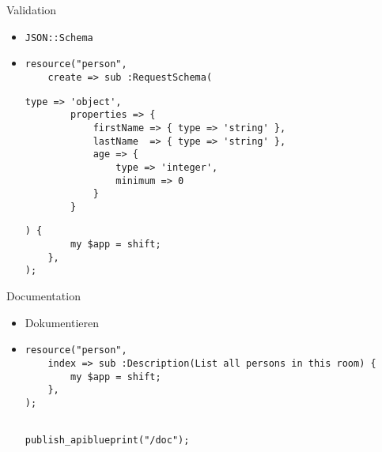 \documentclass[aspectratio=1610]{beamer}
\begin{document}
\begin{frame}[fragile]{Validation}

\begin{itemize}
\item \texttt{JSON::Schema}
\pause
\item[]
\begin{lstlisting}
resource("person",
    create => sub :RequestSchema(
\end{lstlisting}\pause\begin{lstlisting}[firstnumber=last]
        type => 'object',
        properties => {
            firstName => { type => 'string' },
            lastName  => { type => 'string' },
            age => {
                type => 'integer',
                minimum => 0
            }
        }
\end{lstlisting}\pause\begin{lstlisting}[firstnumber=last]
    ) {
        my $app = shift;
    },
);
\end{lstlisting}
\end{itemize}
\end{frame}


\begin{frame}[fragile]{Documentation}

\begin{itemize}
\item Dokumentieren
\pause
\item[]
\begin{lstlisting}
resource("person",
    index => sub :Description(List all persons in this room) {
        my $app = shift;
    },
);
\end{lstlisting}\pause\begin{lstlisting}[firstnumber=last]

publish_apiblueprint("/doc");
\end{lstlisting}
\end{itemize}
\end{frame}

\end{document}
